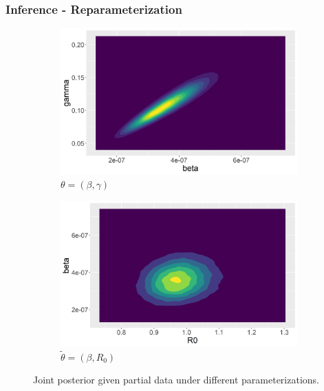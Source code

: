 \documentclass{beamer}
\begin{document}
\begin{frame} \frametitle{Inference - Reparameterization}  
	
	\begin{figure}
	\centering
	\begin{subfigure}[b]{0.49\textwidth}
		\centering
		\includegraphics[width=\textwidth]{E5_beta_gamma_bi_dens}
		\caption{$\theta = (\beta, \gamma)$}
	\end{subfigure}
	\hfill
	\begin{subfigure}[b]{0.49\textwidth}
		\centering
		\includegraphics[width=\textwidth]{E5_R0_beta_bi_dens}
		\caption{$\tilde{\theta} = (\beta, R_0)$}
	\end{subfigure}
	\caption{Joint posterior given partial data under different parameterizations.}
\end{figure}

\end{frame}
\end{document}
